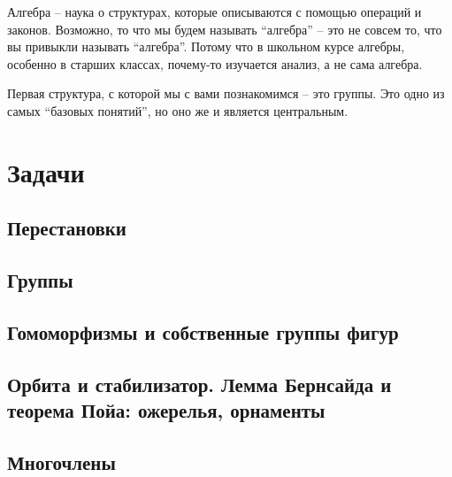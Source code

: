\documentclass[10pt, twoside]{article}
\begin{document}
\pagestyle{empty}

\newpage

\tableofcontents
\newpage

\setcounter{page}{1}
\pagestyle{fancy}

Алгебра -- наука о структурах, которые описываются с помощью операций и законов. 
Возможно, то что мы будем называть ``алгебра'' -- это не совсем то, что вы привыкли называть ``алгебра''. 
Потому что в школьном курсе алгебры, особенно в старших классах, почему-то изучается анализ, а не сама алгебра.

Первая структура, с которой мы с вами познакомимся -- это группы.
Это одно из самых ``базовых понятий'', но оно же и является центральным. 











\newpage
\renewcommand{\thesubsection}{\roman{subsection}}
\setcounter{subsection}{0}

\section*{Задачи}
\subsection{Перестановки}

\subsection{Группы}
\subsection{Гомоморфизмы и собственные группы фигур}
\subsection{Орбита и стабилизатор. Лемма Бернсайда и теорема Пойа: ожерелья, орнаменты}
% 
\subsection{Многочлены}
% 
\end{document}

